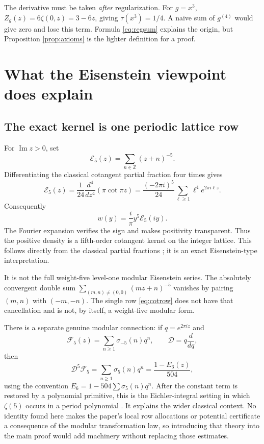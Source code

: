 \documentclass[11pt]{article}
\theoremstyle{definition}
\theoremstyle{remark}\newtheorem*{remark}{Remark}
\newcommand{\Z}{\mathbb Z}
\begin{document}
The derivative must be taken \emph{after} regularization. For $g=x^3$,
$Z_g(z)=6\zeta(0,z)=3-6z$, giving $\tau(x^3)=1/4$.
A naive sum of $g^{(4)}$ would give zero and lose this term. Formula
\eqref{eq:regsum} explains the origin, but Proposition \ref{prop:axioms} is the
lighter definition for a proof.

\section{What the Eisenstein viewpoint does explain}

\subsection{The exact kernel is one periodic lattice row}
For $\operatorname{Im}z>0$, set
\[
 \mathcal E_5(z)=\sum_{n\in\Z}(z+n)^{-5}.
\]
Differentiating the classical cotangent partial fraction four times gives
\begin{equation}\label{eq:cotrow}
 \mathcal E_5(z)=\frac1{24}\frac{d^4}{dz^4}(\pi\cot\pi z)
 =\frac{(-2\pi i)^5}{24}\sum_{\ell\ge1}\ell^4e^{2\pi i\ell z}.
\end{equation}
Consequently
\begin{equation}\label{eq:rowweight}
 \boxed{\displaystyle w(y)=\frac{i}{\pi}y^5\mathcal E_5(iy).}
\end{equation}
The Fourier expansion verifies the sign and makes positivity transparent.
Thus the positive density is a fifth-order cotangent kernel on the integer
lattice. This follows directly from the classical partial fractions
\cite{Cotangent}; it is an exact Eisenstein-type interpretation.

It is not the full weight-five level-one modular Eisenstein series.
The absolutely convergent double sum
$\sum_{(m,n)\ne(0,0)}(mz+n)^{-5}$ vanishes by pairing $(m,n)$ with $(-m,-n)$.
The single row \eqref{eq:cotrow} does not have that cancellation and is not, by
itself, a weight-five modular form.

There is a separate genuine modular connection: if $q=e^{2\pi iz}$ and
\[
 \mathcal F_5(z)=\sum_{n\ge1}\sigma_{-5}(n)q^n,
 \qquad \mathcal D=q\frac d{dq},
\]
then
\[
 \mathcal D^5\mathcal F_5=\sum_{n\ge1}\sigma_5(n)q^n
 =\frac{1-E_6(z)}{504},
\]
using the convention $E_6=1-504\sum\sigma_5(n)q^n$.
After the constant term is restored by a polynomial primitive, this is the
Eichler-integral setting in which $\zeta(5)$ occurs in a period polynomial
\cite{Ramanujan}. It explains the wider classical context. No identity found
here makes the paper's local row allocations or potential certificate a
consequence of the modular transformation law, so introducing that theory into
the main proof would add machinery without replacing those estimates.
\end{document}
